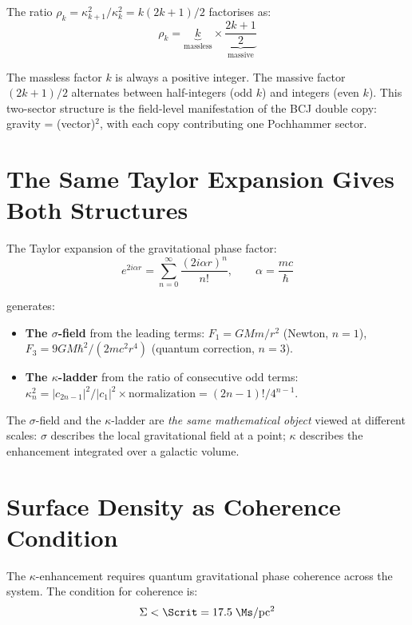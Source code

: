 The ratio $\rho_k = \kappa_{k+1}^2/\kappa_k^2 = k(2k+1)/2$ factorises as:
\begin{equation}
  \rho_k = \underbrace{k}_{\text{massless}} \times \underbrace{\frac{2k+1}{2}}_{\text{massive}}
\end{equation}

The massless factor $k$ is always a positive integer.  The massive factor $(2k+1)/2$ alternates between half-integers (odd $k$) and integers (even $k$).  This two-sector structure is the field-level manifestation of the BCJ double copy: gravity = (vector)$^2$, with each copy contributing one Pochhammer sector.

\section{The Same Taylor Expansion Gives Both Structures}

The Taylor expansion of the gravitational phase factor:
\begin{equation}
  e^{2i\alpha r} = \sum_{n=0}^\infty \frac{(2i\alpha r)^n}{n!}, \qquad \alpha = \frac{mc}{\hbar}
\end{equation}

generates:
\begin{itemize}
  \item \textbf{The $\sigma$-field} from the leading terms: $F_1 = GMm/r^2$ (Newton, $n=1$), $F_3 = 9GM\hbar^2/(2mc^2r^4)$ (quantum correction, $n=3$).
  \item \textbf{The $\kappa$-ladder} from the ratio of consecutive odd terms: $\kappa_n^2 = |c_{2n-1}|^2/|c_1|^2 \times \text{normalization} = (2n-1)!/4^{n-1}$.
\end{itemize}

The $\sigma$-field and the $\kappa$-ladder are \emph{the same mathematical object} viewed at different scales: $\sigma$ describes the local gravitational field at a point; $\kappa$ describes the enhancement integrated over a galactic volume.

\section{Surface Density as Coherence Condition}

The $\kappa$-enhancement requires quantum gravitational phase coherence across the system.  The condition for coherence is:
\begin{equation}
  \Sigma < \Scrit = 17.5\;\Ms/\mathrm{pc}^2
\end{equation}

